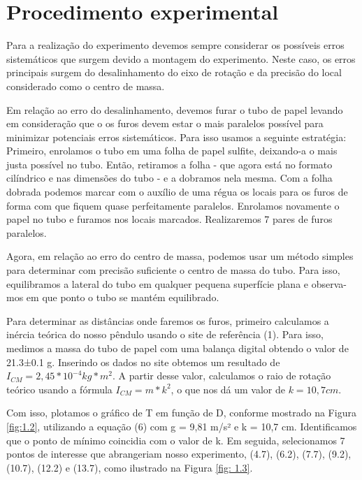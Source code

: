 \documentclass[hidelinks,a4paper,10pt]{article}
\begin{document}
\section*{Procedimento experimental}

\qquad Para a realização do experimento devemos sempre considerar os possíveis erros sistemáticos que surgem devido a montagem do experimento. Neste caso, os erros principais surgem do desalinhamento do eixo de rotação e da precisão do local considerado como o centro de massa.

\qquad Em relação ao erro do desalinhamento, devemos furar o tubo de papel levando em consideração que o os furos devem estar o mais paralelos possível para minimizar potenciais erros sistemáticos. Para isso usamos a seguinte estratégia: Primeiro, enrolamos o tubo em uma folha de papel sulfite, deixando-a o mais justa possível no tubo. Então, retiramos a folha - que agora está no formato cilíndrico e nas dimensões do tubo - e a dobramos nela mesma. Com a folha dobrada podemos marcar com o auxílio de uma régua os locais para os furos de forma com que fiquem quase perfeitamente paralelos. Enrolamos novamente o papel no tubo e furamos nos locais marcados. Realizaremos 7 pares de furos paralelos.

\quad Agora, em relação ao erro do centro de massa, podemos usar um método simples para determinar com precisão suficiente o centro de massa do tubo. Para isso, equilibramos a lateral do tubo em qualquer pequena superfície plana e observa-mos em que ponto o tubo se mantém equilibrado.

\quad Para determinar as distâncias onde faremos os furos, primeiro calculamos a inércia teórica do nosso pêndulo usando o site de referência (1). Para isso, medimos a massa do tubo de papel com uma balança digital obtendo o valor de 21.3±0.1 g. Inserindo os dados no site obtemos um resultado de $I_{CM} = 2,45 * 10^{-4} kg*m^2$. A partir desse valor, calculamos o raio de rotação teórico usando a fórmula $I_{CM} = m * k^2$, o que nos dá um valor de $k = 10,7 cm$.   

\quad Com isso, plotamos o gráfico de T em função de D, conforme mostrado na Figura \ref{fig:1.2}, utilizando a equação (6) com g = 9,81 m/s² e k = 10,7 cm. Identificamos que o ponto de mínimo coincidia com o valor de k. Em seguida, selecionamos 7 pontos de interesse que abrangeriam nosso experimento, (4.7), (6.2), (7.7), (9.2), (10.7), (12.2) e (13.7), como ilustrado na Figura \ref{fig: 1.3}.
\end{document}
